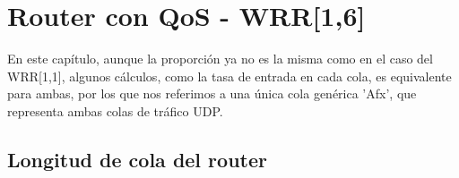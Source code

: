 \chapter{Router con QoS - WRR[1,6]}
\label{chap:conqoswrr16}
\renewcommand{\theenumi}{\alph{enumi}}

\tcolorbox[colback=yellow!20, colframe=yellow!50!black, title=Nota]
En este capítulo, aunque la proporción ya no es la misma como en el caso del WRR[1,1], algunos 
cálculos, como la tasa de entrada en cada cola, es equivalente para ambas, por los que nos 
referimos a una única cola genérica 'Afx', que representa ambas colas de tráfico UDP.
\endtcolorbox

\section{Longitud de cola del router}

